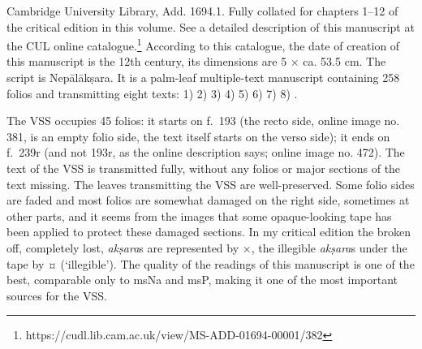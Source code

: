 \documentclass[11pt]{book}
\begin{document}
\noindent
{}
Cambridge University Library, Add. 1694.1. Fully collated for chapters
1--12 of the critical edition in this volume. See a detailed description
of this manuscript at the CUL online catalogue.\footnote{https://cudl.lib.cam.ac.uk/view/MS-ADD-01694-00001/382}
According to this catalogue, the date of creation of this manuscript 
is the 12th century, its dimensions are 5 × ca. 53.5 cm. The script is
Nepālākṣara. It is a palm-leaf multiple-text manuscript containing 258
folios and transmitting eight texts: 
1)  
2)  
3)  
4)  
5)  
6) 
7)  
8) .

The VSS occupies 45 folios: it starts on f.~193 (the recto side, online
image no. 381, is an empty folio side, the text itself starts on the
verso side); it ends on f.~239r (and not 193r, as the online description
says; online image no. 472). The text of the VSS is transmitted fully,
without any folios or major sections of the text missing. The leaves
transmitting the VSS are well-preserved. Some folio sides are faded and
most folios are somewhat damaged on the right side, sometimes at other parts, and it seems from the images that some opaque-looking tape has been applied to protect these damaged sections. 
In my critical edition
the broken off, completely lost, \emph{akṣara}s are represented by ×,
the illegible \emph{akṣara}s under the tape by ¤ (`illegible'). The
quality of the readings of this manuscript is one of the best,
comparable only to msNa and msP, making it one of the most important
sources for the VSS.
\end{document}
